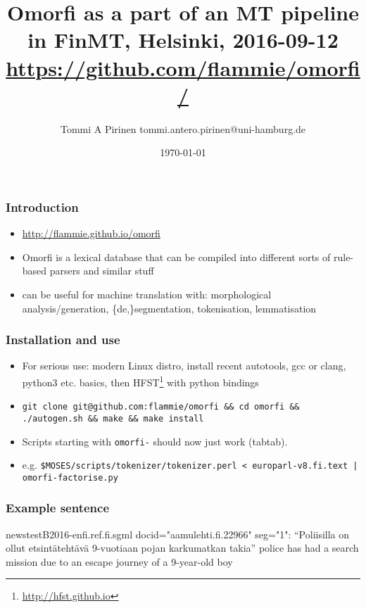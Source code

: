 \documentclass{beamer}
\title{Omorfi as a part of an MT pipeline
\scriptsize{in FinMT, Helsinki, 2016-09-12\\
\url{https://github.com/flammie/omorfi/}}}
\author{Tommi A Pirinen \scriptsize \guilsinglleft tommi.antero.pirinen@uni-hamburg.de \guilsinglright }
\institute{HZSK.de, de.CLARIN.eu, etc.}
\date{\today}
\begin{document}

\maketitle

\begin{frame}
    \frametitle{Introduction}
    \begin{itemize}
        \item \url{http://flammie.github.io/omorfi}
        \item Omorfi is a lexical database that can be compiled into different
            sorts of rule-based parsers and similar stuff
        \item can be useful for machine translation with: morphological
            analysis/generation, \{de,\}segmentation, tokenisation,
            lemmatisation
    \end{itemize}
\end{frame}


\begin{frame}
    \frametitle{Installation and use}
    \begin{itemize}
        \item For serious use: modern Linux distro, install recent autotools,
            gcc or clang, python3 etc. basics, then
            HFST\footnote{\url{http://hfst.github.io}} with python bindings
        \item \texttt{git clone git@github.com:flammie/omorfi \&\& cd omorfi
            \&\& ./autogen.sh \&\& make \&\& make install}
        \item Scripts starting with \texttt{omorfi-} should now just work
            (tabtab).
        \item e.g. \texttt{\$MOSES/scripts/tokenizer/tokenizer.perl <
            europarl-v8.fi.text | omorfi-factorise.py}
    \end{itemize}
\end{frame}

\begin{frame}
    \frametitle{Example sentence}
    newstestB2016-enfi.ref.fi.sgml docid="aamulehti.fi.22966" seg="1":
    ``Poliisilla on ollut etsintätehtävä 9-vuotiaan pojan karkumatkan takia''
    police has had a search mission due to an escape journey of a 9-year-old boy
\end{frame}
\end{document}
